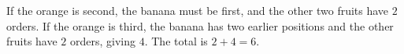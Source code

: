 If the orange is second, the banana must be first, and the other two fruits have $2$ orders. If the orange is third, the banana has two earlier positions and the other fruits have $2$ orders, giving $4$. The total is $2+4=\boxed6$.
